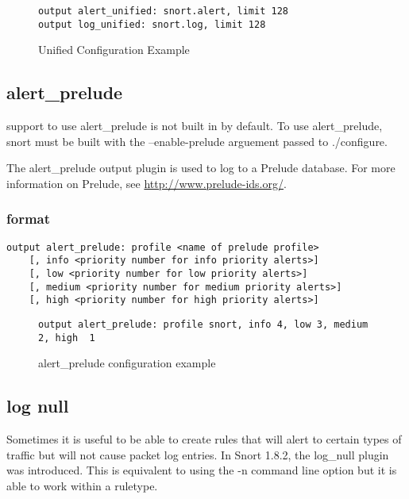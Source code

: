 \documentclass[english]{report}
\newenvironment{note}{
\samepage
    \vspace{10pt}{\textsf{
        {\hspace{7pt}\Huge{$\triangle$\hspace{-12.5pt}{\Large{$^!$}}}}\hspace{5pt}
        {\Large{NOTE}}
    }
    }
   \begin{center}
    \par\vspace{-17pt}

    \begin{lrbox}{\savepar}
    \begin{minipage}[r]{6in}
}
{
    \end{minipage}
    \end{lrbox}
    \fbox{
        \usebox{
            \savepar
	}
    }
    \par\vskip10pt
    \end{center}
}
\newenvironment{note}{
        \begin{rawhtml}
        <p><table border="1"><tr><td><b>
        Note:&nbsp;&nbsp;</b>
        \end{rawhtml}
}{
        \begin{rawhtml}
        </b></td></tr></table></p>
        \end{rawhtml}
}
\begin{document}
\begin{figure}[!hbpt]
\begin{verbatim}
output alert_unified: snort.alert, limit 128
output log_unified: snort.log, limit 128
\end{verbatim}
\caption{Unified Configuration Example\label{unified example}}
\end{figure}


\subsection{alert\_prelude}

\begin{note}
support to use alert\_prelude is not built in by default.  To use alert\_prelude, snort must be built with the --enable-prelude arguement passed to ./configure.
\end{note}

The alert\_prelude output plugin is used to log to a Prelude database.  For more information on Prelude, see \url{http://www.prelude-ids.org/}.

\subsubsection{format}

\begin{verbatim}
output alert_prelude: profile <name of prelude profile> 
    [, info <priority number for info priority alerts>]
    [, low <priority number for low priority alerts>]
    [, medium <priority number for medium priority alerts>]
    [, high <priority number for high priority alerts>]
\end{verbatim}

\begin{figure}[!hbpt]
\begin{verbatim}
output alert_prelude: profile snort, info 4, low 3, medium 2, high  1
\end{verbatim}
\caption{alert\_prelude configuration example\label{prelude example}}
\end{figure}

\subsection{log null}

Sometimes it is useful to be able to create rules that will alert
to certain types of traffic but will not cause packet log entries.
In Snort 1.8.2, the log\_null plugin was introduced. This is equivalent
to using the -n command line option but it is able to work within
a ruletype.
\end{document}
